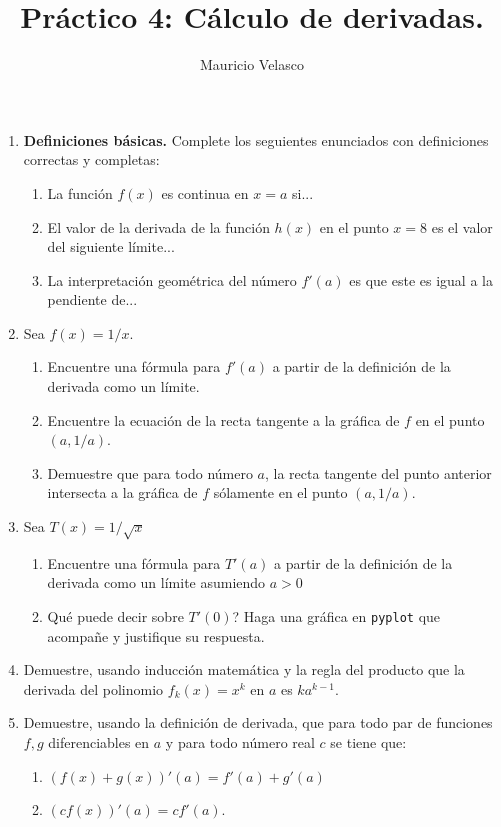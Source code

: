\documentclass[12pt, a4paper]{article}
\date{}
\begin{document}
\title{Pr\'actico 4: Cálculo de derivadas.}
\author{Mauricio Velasco}
\maketitle{}
\begin{enumerate}
\item {\bf Definiciones básicas.} Complete los seguientes enunciados con definiciones correctas y completas:
\begin{enumerate}
\item La función $f(x)$ es continua en $x=a$ si...
\item El valor de la derivada de la función $h(x)$ en el punto $x=8$ es el valor del siguiente límite...
\item La interpretación geométrica del número $f'(a)$ es que este es igual a la pendiente de...
\end{enumerate}


\item Sea $f(x)=1/x$. 
\begin{enumerate}
\item Encuentre una fórmula para $f'(a)$ a partir de la definición de la derivada como un límite.
\item Encuentre la ecuación de la recta tangente a la gráfica de $f$ en el punto $(a,1/a)$.
\item Demuestre que para todo número $a$, la recta tangente del punto anterior intersecta a la gráfica de $f$ sólamente en el punto $(a,1/a)$. 
\end{enumerate}
\item Sea $T(x)=1/\sqrt{x}$
\begin{enumerate}
\item Encuentre una fórmula para $T'(a)$ a partir de la definición de la derivada como un límite asumiendo $a>0$
\item Qué puede decir sobre $T'(0)$? Haga una gráfica en \verb!pyplot! que acompañe y justifique su respuesta.
\end{enumerate}

\item Demuestre, usando inducción matemática y la regla del producto que la derivada del polinomio $f_k(x)=x^k$ en $a$ es $ka^{k-1}$.

\item Demuestre, usando la definición de derivada, que para todo par de funciones $f,g$  diferenciables en $a$ y para todo número real $c$ se tiene que:
\begin{enumerate}
\item $\left(f(x)+g(x)\right)'(a) = f'(a)+g'(a)$
\item $\left(cf(x)\right)'(a)= cf'(a)$.
\end{enumerate} 




\end{enumerate}
\end{document}
